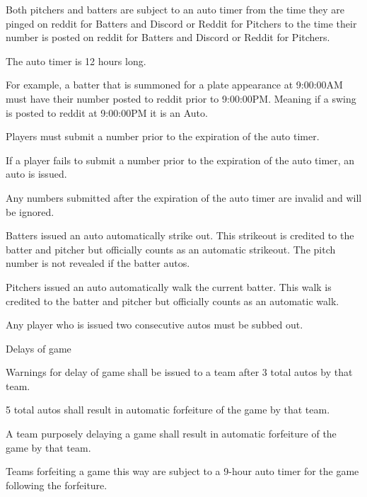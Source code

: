 \begin{deepEnumerate}
	\begin{deepEnumerate}
		\item  Both pitchers and batters are subject to an auto timer from the time they are pinged on reddit for Batters and Discord or Reddit for Pitchers to the time their number is posted on reddit for Batters and Discord or Reddit for Pitchers. 
		\item The auto timer is 12 hours long.
		\begin{deepEnumerate}
			\item For example, a batter that is summoned for a plate appearance at 9:00:00AM must have their number posted to reddit prior to 9:00:00PM.  Meaning if a swing is posted to reddit at 9:00:00PM it is an Auto.
		\end{deepEnumerate}
		\item Players must submit a number prior to the expiration of the auto timer.
		\item If a player fails to submit a number prior to the expiration of the auto timer, an auto is issued.
		\begin{deepEnumerate}
			\item Any numbers submitted after the expiration of the auto timer are invalid and will be ignored.
			\item Batters issued an auto automatically strike out. This strikeout is credited to the batter and pitcher but officially counts as an automatic strikeout.
			The pitch number is not revealed if the batter autos.
			\item Pitchers issued an auto automatically walk the current batter. This walk is credited to the batter and pitcher but officially counts as an automatic walk.
		\end{deepEnumerate}
		\item Any player who is issued two consecutive autos must be subbed out.
		\item Delays of game
		\begin{deepEnumerate}
			\item Warnings for delay of game shall be issued to a team after 3 total autos by that team.
			\item 5 total autos shall result in automatic forfeiture of the game by that team.
			\item A team purposely delaying a game shall result in automatic forfeiture of the game by that team.
			\begin{deepEnumerate}
				\item Teams forfeiting a game this way are subject to a 9-hour auto timer for the game following the forfeiture.

\end{deepEnumerate}
\end{deepEnumerate}
\end{deepEnumerate}
\end{deepEnumerate}

